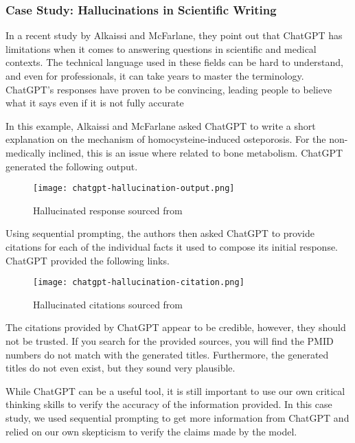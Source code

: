 \documentclass[12pt]{article}
\begin{document}
\subsubsection{Case Study: Hallucinations in Scientific Writing}
In a recent study by Alkaissi and McFarlane, they point out that ChatGPT has limitations when it comes to answering questions in scientific and medical contexts. The technical language used in these fields can be hard to understand, and even for professionals, it can take years to master the terminology. ChatGPT's responses have proven to be convincing, leading people to believe what it says even if it is not fully accurate 

In this example, Alkaissi and McFarlane asked ChatGPT to write a short explanation on the mechanism of homocysteine-induced osteporosis. For the non-medically inclined, this is an issue where related to bone metabolism. ChatGPT generated the following output.

\begin{figure}[H]
  \centering
  \texttt{[image: chatgpt-hallucination-output.png]}
  \caption{Hallucinated response sourced from \cite{alkaissi_mcfarlane_2023}}
  \label{fig:mostly-correct-medical-output}
\end{figure}

Using sequential prompting, the authors then asked ChatGPT to provide citations for each of the individual facts it used to compose its initial response. ChatGPT provided the following links.

\begin{figure}[H]
  \centering
  \texttt{[image: chatgpt-hallucination-citation.png]}
  \caption{Hallucinated citations sourced from \cite{alkaissi_mcfarlane_2023}}
  \label{fig:mostly-correct-medical-output}
\end{figure}

The citations provided by ChatGPT appear to be credible, however, they should not be trusted. If you search for the provided sources, you will find the PMID numbers do not match with the generated titles. Furthermore, the generated titles do not even exist, but they sound very plausible. 

While ChatGPT can be a useful tool, it is still important to use our own critical thinking skills to verify the accuracy of the information provided. In this case study, we used sequential prompting to get more information from ChatGPT and relied on our own skepticism to verify the claims made by the model.
\end{document}
